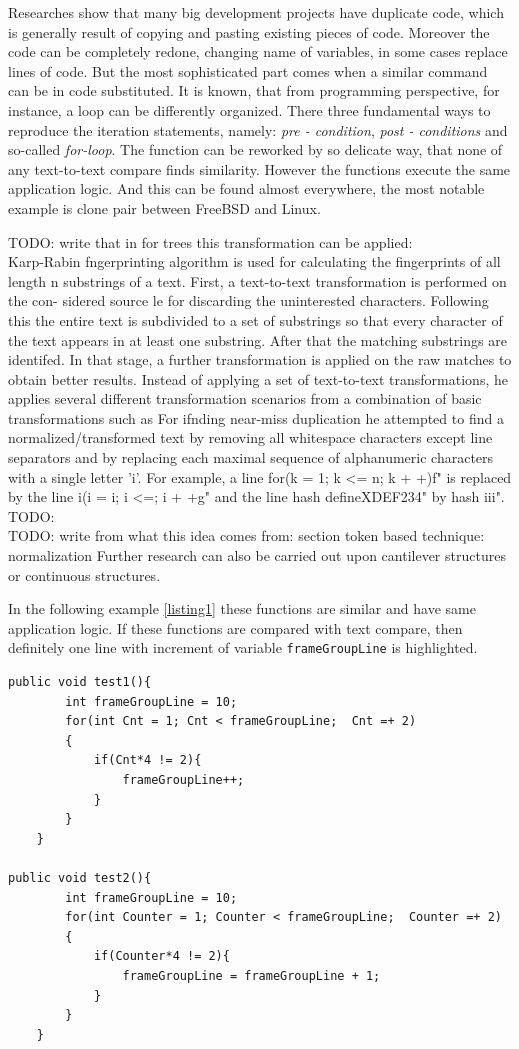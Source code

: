 \documentclass{report}
\begin{document}
Researches show that many big development projects have duplicate code, which is generally result of copying and pasting existing pieces of code. Moreover the code can be completely redone, changing name of variables, in some cases replace lines of code. But the most sophisticated part comes when a similar command can be in code substituted. It is known, that from programming perspective, for instance, a loop can be differently organized. There three fundamental ways to reproduce the iteration statements, namely: \emph{pre - condition}, \emph{post - conditions} and so-called \emph{for-loop}. The function can be reworked by so delicate way, that none of any text-to-text compare finds similarity. However the functions execute the same application logic. And this can be found almost everywhere, the most notable example is clone pair between FreeBSD and Linux. 

TODO: write that in for trees this transformation can be applied:\\
Karp-Rabin fngerprinting algorithm is used for calculating the fingerprints of all
length n substrings of a text. First, a text-to-text transformation is performed on the con-
sidered source le for discarding the uninterested characters. Following this the entire text
is subdivided to a set of substrings so that every character of the text appears in at least
one substring. After that the matching substrings are identifed. In that stage, a further
transformation is applied on the raw matches to obtain better results. Instead of applying
a set of text-to-text transformations, he applies several different transformation scenarios
from a combination of basic transformations such as  For ifnding near-miss duplication he
attempted to find a normalized/transformed text by removing all whitespace characters
except line separators and by replacing each maximal sequence of alphanumeric characters
with a single letter 'i'. For example, a line for(k = 1; k <= n; k + +)f" is replaced by
the line i(i = i; i <=; i + +g" and the line hash defineXDEF234" by hash iii".
TODO:
\\

TODO: write from what this idea comes from: section token based technique: normalization
Further research can also be carried out upon cantilever structures or continuous structures.

In the following example \ref{listing1} these functions are similar and have same application logic. If these functions are compared with text compare, then definitely one line with increment of variable \texttt{frameGroupLine} is highlighted. 
\newpage
\begin{lstlisting}[caption={Clone pair between FreeBSD and Linux}, label = listing1]
public void test1(){
		int frameGroupLine = 10;
		for(int Cnt = 1; Cnt < frameGroupLine;  Cnt =+ 2)
		{
			if(Cnt*4 != 2){
				frameGroupLine++;
			}
		}
	}
	
public void test2(){
		int frameGroupLine = 10;
		for(int Counter = 1; Counter < frameGroupLine;  Counter =+ 2)
		{
			if(Counter*4 != 2){ 
				frameGroupLine = frameGroupLine + 1;
			}
		}
	}	
\end{lstlisting}
\end{document}
